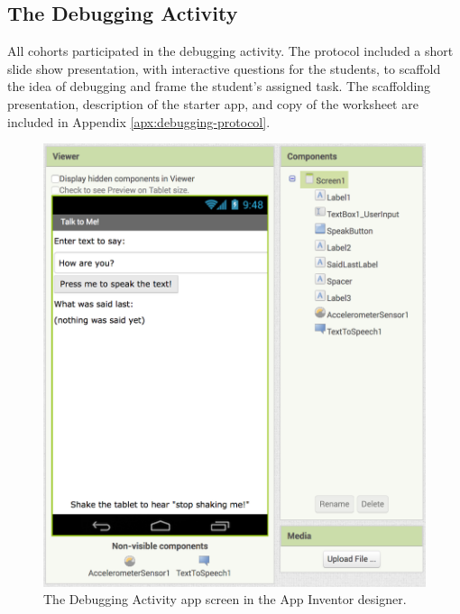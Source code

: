 


\subsection{The Debugging Activity}
All cohorts participated in the debugging activity. The protocol included a short slide show presentation, with interactive questions for the students, to scaffold the idea of debugging and frame the student's assigned task. The scaffolding presentation, description of the starter app, and copy of the worksheet are included in Appendix \ref{apx:debugging-protocol}.

\begin{figure}
  \centering
      \includegraphics[width=\textwidth]{images/debugActivity/debug-designer}
  \caption[The Debugging Activity Designer View]{The Debugging Activity app screen in the App Inventor designer.}
  \label{fig:debug-screen}
\end{figure}

